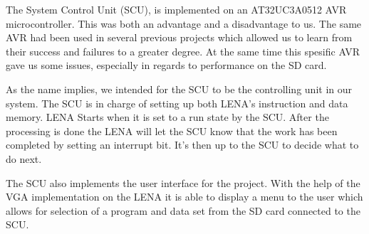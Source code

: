 The System Control Unit (SCU), is implemented on an AT32UC3A0512 AVR microcontroller. This was both an advantage and a disadvantage to us. The same AVR had been used in several previous projects which allowed us to learn from their success and failures to a greater degree. At the same time this spesific AVR gave us some issues, especially in regards to performance on the SD card. 

\begin{comment}
Denna prosess tingen hører ikke hjemme under 'introduction'

When we first started working on the SCU we focused mostly on the hardware mappings as this was needed for the PCB to be delivered. We made sure to make it as similar as possible to the EVK1100 test card which we had avaliable. This made it possible for us to begin writing and testing some of our code before the PCB arrived. Having completed this we were able to start thinking about the code and to define what we figured we would need in terms of functions and headers for our application. Granted this was not set in stone as much of the design was yet to be determined, but it gave us a starting point to which we were able to work and improve upon.
\end{comment}

As the name implies, we intended for the SCU to be the controlling unit in our system. The SCU is in charge of setting up both LENA's instruction and data memory. LENA Starts when it is set to a run state by the SCU. After the processing is done the LENA will let the SCU know that the work has been completed by setting an interrupt bit. It's then up to the SCU to decide what to do next. 

The SCU also implements the user interface for the project. With the help of the VGA implementation on the LENA it is able to display a menu to the user which allows for selection of a program and data set from the SD card connected to the SCU.

